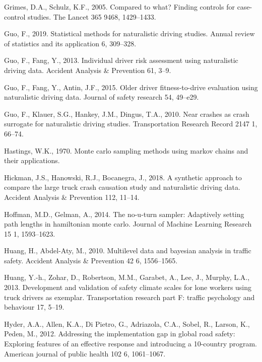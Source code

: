 \documentclass[12pt]{book}
\numberwithin{equation}{chapter}
\begin{document}
\leavevmode\hypertarget{ref-grimes2005compared}{}%
Grimes, D.A., Schulz, K.F., 2005. Compared to what? Finding controls for case-control studies. The Lancet 365 9468, 1429--1433.

\leavevmode\hypertarget{ref-guo2019statistical}{}%
Guo, F., 2019. Statistical methods for naturalistic driving studies. Annual review of statistics and its application 6, 309--328.

\leavevmode\hypertarget{ref-guo2013individual}{}%
Guo, F., Fang, Y., 2013. Individual driver risk assessment using naturalistic driving data. Accident Analysis \& Prevention 61, 3--9.

\leavevmode\hypertarget{ref-guo2015older}{}%
Guo, F., Fang, Y., Antin, J.F., 2015. Older driver fitness-to-drive evaluation using naturalistic driving data. Journal of safety research 54, 49--e29.

\leavevmode\hypertarget{ref-guo2010near}{}%
Guo, F., Klauer, S.G., Hankey, J.M., Dingus, T.A., 2010. Near crashes as crash surrogate for naturalistic driving studies. Transportation Research Record 2147 1, 66--74.

\leavevmode\hypertarget{ref-hastings1970monte}{}%
Hastings, W.K., 1970. Monte carlo sampling methods using markov chains and their applications.

\leavevmode\hypertarget{ref-hickman2018synthetic}{}%
Hickman, J.S., Hanowski, R.J., Bocanegra, J., 2018. A synthetic approach to compare the large truck crash causation study and naturalistic driving data. Accident Analysis \& Prevention 112, 11--14.

\leavevmode\hypertarget{ref-hoffman2014no}{}%
Hoffman, M.D., Gelman, A., 2014. The no-u-turn sampler: Adaptively setting path lengths in hamiltonian monte carlo. Journal of Machine Learning Research 15 1, 1593--1623.

\leavevmode\hypertarget{ref-huang2010multilevel}{}%
Huang, H., Abdel-Aty, M., 2010. Multilevel data and bayesian analysis in traffic safety. Accident Analysis \& Prevention 42 6, 1556--1565.

\leavevmode\hypertarget{ref-huang2013development}{}%
Huang, Y.-h., Zohar, D., Robertson, M.M., Garabet, A., Lee, J., Murphy, L.A., 2013. Development and validation of safety climate scales for lone workers using truck drivers as exemplar. Transportation research part F: traffic psychology and behaviour 17, 5--19.

\leavevmode\hypertarget{ref-hyder2012addressing}{}%
Hyder, A.A., Allen, K.A., Di Pietro, G., Adriazola, C.A., Sobel, R., Larson, K., Peden, M., 2012. Addressing the implementation gap in global road safety: Exploring features of an effective response and introducing a 10-country program. American journal of public health 102 6, 1061--1067.
\end{document}
